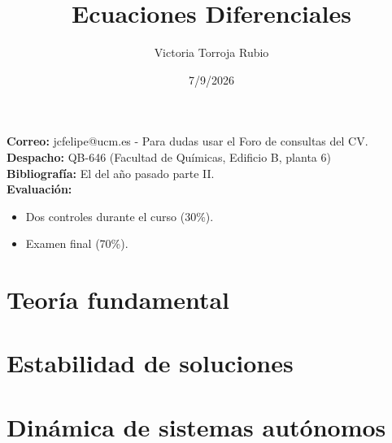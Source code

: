 \documentclass{report}
\begin{document}
\title{Ecuaciones Diferenciales}
\author{Victoria Torroja Rubio}
\date{7/9/2026}

\maketitle

\tableofcontents

\pagebreak

\textbf{Correo:} jcfelipe@ucm.es - Para dudas usar el Foro de consultas del CV.\\
\textbf{Despacho:} QB-646 (Facultad de Químicas, Edificio B, planta 6) \\
\textbf{Bibliografía:} El del año pasado parte II.\\
\textbf{Evaluación:} 
\begin{itemize}
\item Dos controles durante el curso (30\%).
\item Examen final (70\%).
\end{itemize}
\part{Teoría fundamental}



\part{Estabilidad de soluciones}



\part{Dinámica de sistemas autónomos}


\end{document}
